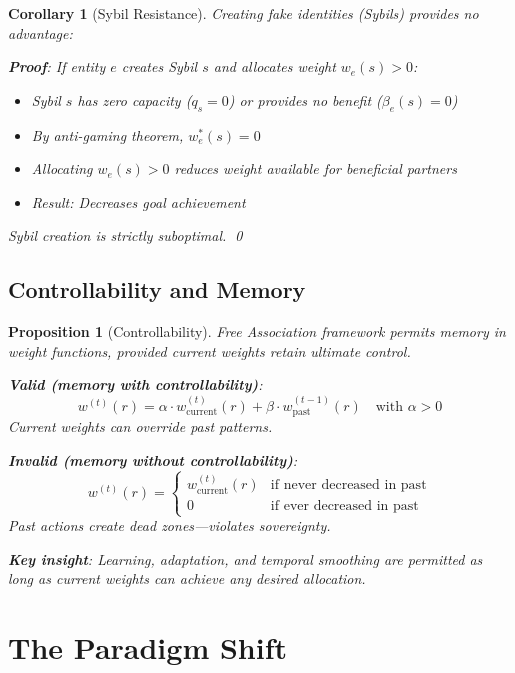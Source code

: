 \documentclass[11pt]{article}
\newtheorem{proposition}{Proposition}
\newtheorem{corollary}{Corollary}
\begin{document}
\begin{corollary}[Sybil Resistance]
Creating fake identities (Sybils) provides no advantage:

\textbf{Proof}: If entity $e$ creates Sybil $s$ and allocates weight $w_e(s) > 0$:
\begin{itemize}
\item Sybil $s$ has zero capacity ($q_s = 0$) or provides no benefit ($\beta_e(s) = 0$)
\item By anti-gaming theorem, $w_e^*(s) = 0$
\item Allocating $w_e(s) > 0$ reduces weight available for beneficial partners
\item Result: Decreases goal achievement
\end{itemize}

Sybil creation is strictly suboptimal. \qed
\end{corollary}

\subsection{Controllability and Memory}

\begin{proposition}[Controllability]
\label{prop:controllability-commons}
Free Association framework permits memory in weight functions, provided current weights retain ultimate control.

\textbf{Valid (memory with controllability)}:
\[
w^{(t)}(r) = \alpha \cdot w_{\text{current}}^{(t)}(r) + \beta \cdot w_{\text{past}}^{(t-1)}(r) \quad \text{with } \alpha > 0
\]
Current weights can override past patterns.

\textbf{Invalid (memory without controllability)}:
\[
w^{(t)}(r) = \begin{cases}
w_{\text{current}}^{(t)}(r) & \text{if never decreased in past} \\
0 & \text{if ever decreased in past}
\end{cases}
\]
Past actions create dead zones—violates sovereignty.

\textbf{Key insight}: Learning, adaptation, and temporal smoothing are permitted as long as current weights can achieve any desired allocation.
\end{proposition}

\section{The Paradigm Shift}
\end{document}
